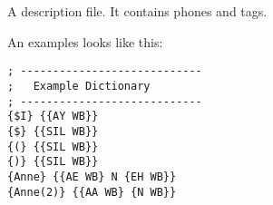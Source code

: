 
\section{}

A  description file. It contains phones and tags.

An examples looks like this:

\begin{verbatim}
; ----------------------------
;   Example Dictionary
; ----------------------------
{$I} {{AY WB}}
{$} {{SIL WB}}
{(} {{SIL WB}}
{)} {{SIL WB}}
{Anne} {{AE WB} N {EH WB}}
{Anne(2)} {{AA WB} {N WB}}
\end{verbatim}

